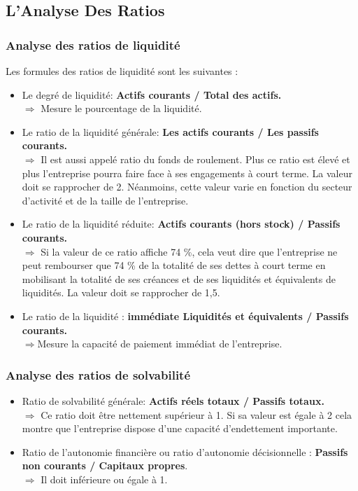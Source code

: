 \documentclass[a4paper,10pt]{article}
\begin{document}
\subsection{L'Analyse Des Ratios}
	\subsubsection{Analyse des ratios de liquidité}
	Les formules des ratios de liquidité sont les suivantes : \\
	\begin{itemize}
\item Le degré de liquidité: \textbf{Actifs courants / Total des actifs.}\\
$\Rightarrow$	Mesure le pourcentage de la liquidité.
\item Le ratio de la liquidité générale: \textbf{Les actifs courants / Les passifs courants.}\\
$\Rightarrow$	Il est aussi appelé ratio du fonds de roulement. Plus ce ratio est élevé et plus l'entreprise pourra faire face à ses engagements à court terme. La valeur doit se rapprocher de 2. Néanmoins, cette valeur varie en fonction du secteur d'activité et de la taille de l'entreprise.

\item Le ratio de la liquidité réduite: \textbf{Actifs courants (hors stock) / Passifs courants.}\\
$\Rightarrow $ Si la valeur de ce ratio affiche 74 \%, cela veut dire que l'entreprise ne peut rembourser que 74 \% de la totalité de ses dettes à court terme en mobilisant la totalité de ses créances et de ses liquidités et équivalents de liquidités. La valeur doit se rapprocher de 1,5.
\item Le ratio de la liquidité : \textbf{immédiate Liquidités et équivalents / Passifs courants.}\\
$ \Rightarrow $Mesure la capacité de paiement immédiat de l'entreprise.
	\end{itemize}
	\subsubsection{Analyse des ratios de solvabilité}
	\begin{itemize}
	\item Ratio de solvabilité générale: \textbf{Actifs réels totaux / Passifs totaux.} \\
$\Rightarrow$ Ce ratio doit être nettement supérieur à 1. Si sa valeur est égale à 2 cela montre que l’entreprise dispose d’une capacité d’endettement importante.
	\item Ratio de l'autonomie financière ou ratio d'autonomie décisionnelle : \textbf{Passifs non courants / Capitaux propres}.\\
$\Rightarrow$ Il doit inférieure ou égale à 1.
	\end{itemize}
	
	
\end{document}
